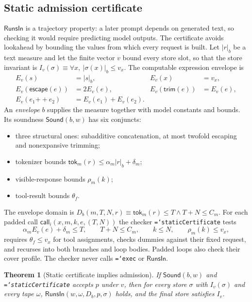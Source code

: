 \documentclass[preprint,12pt]{elsarticle}
\newtheorem{theorem}{Theorem}
\theoremstyle{definition}
\newcommand{\code}[1]{\texttt{\hyphenchar\font=`\-#1}}
\begin{document}
\subsection{Static admission certificate}\label{sec:static}

$\mathsf{RunsIn}$ is a trajectory property: a later prompt depends on generated
text, so checking it would require predicting model outputs. The certificate
avoids lookahead by bounding the values from which every request is built. Let
$|r|_b$ be a text measure and let the finite vector $v$ bound every store slot, so
that the store invariant is $I_v(\sigma)\equiv\forall x,\ |\sigma(x)|_b\leq v_x$. The
computable expression envelope is
\[
\begin{aligned}
E_v(s)&=|s|_b, & E_v(x)&=v_x,\\
E_v(\mathsf{escape}(e))&=2E_v(e), & E_v(\mathsf{trim}(e))&=E_v(e),\\
E_v(e_1{+\!+}e_2)&=E_v(e_1)+E_v(e_2).
\end{aligned}
\]
An \emph{envelope} $b$ supplies the measure together with model constants and
bounds. Its soundness $\mathsf{Sound}(b,w)$ has six conjuncts:
\begin{itemize}
\item three structural ones: subadditive concatenation, at most twofold escaping
and nonexpansive trimming;
\item tokenizer bounds $\mathsf{tok}_m(r)\leq\alpha_m|r|_b+\delta_m$;
\item visible-response bounds $\rho_m(k)$;
\item tool-result bounds $\theta_f$.
\end{itemize}
The envelope domain is
$D_b(m,T,N,r)\equiv\mathsf{tok}_m(r)\leq T\land T+N\leq C_m$. For each padded call
$\mathsf{call}_i(x,m,k,e,(T,N))$ the checker \code{staticCertificate} tests
\[
\alpha_m E_v(e)+\delta_m\leq T,\qquad T+N\leq C_m,\qquad k\leq N,\qquad\rho_m(k)\leq v_x,
\]
requires $\theta_f\leq v_x$ for tool assignments, checks dummies against their
fixed request, and recurses into both branches and loop bodies. Padded loops also
check their cover profile. The checker never calls \code{exec} or
$\mathsf{RunsIn}$.

\begin{theorem}[Static certificate implies admission]\label{thm:static}
If $\mathsf{Sound}(b,w)$ and \code{staticCertificate} accepts $p$ under $v$, then
for every store $\sigma$ with $I_v(\sigma)$ and every tape $\omega$,
$\mathsf{RunsIn}(w,\omega,D_b,p,\sigma)$ holds, and the final store satisfies $I_v$.
\end{theorem}
\end{document}
